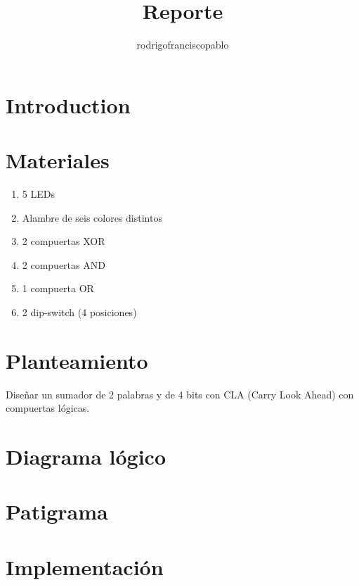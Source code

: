 \documentclass{mylib/reporte}
\title{Reporte}
\author{rodrigofranciscopablo }
\begin{document}
\coverPage

\tableofcontents
\newpage

\section{Introduction}

\section{Materiales}

\begin{enumerate}
	\item 5 LEDs
	\item Alambre de seis colores distintos
	\item 2 compuertas XOR
	\item 2 compuertas AND
	\item 1 compuerta OR
	\item 2 dip-switch (4 posiciones)
\end{enumerate}	

\section{Planteamiento}

Diseñar un sumador de 2 palabras y de 4 bits con CLA (Carry Look Ahead) con compuertas lógicas.

\section{Diagrama lógico}

\section{Patigrama}

\section{Implementación}
\end{document}
